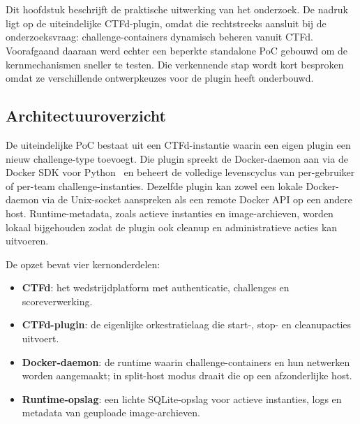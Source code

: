 
\chapter{}%
\label{ch:poc}

Dit hoofdstuk beschrijft de praktische uitwerking van het onderzoek. De nadruk ligt op de uiteindelijke CTFd-plugin, omdat die rechtstreeks aansluit bij de onderzoeksvraag: challenge-containers dynamisch beheren vanuit CTFd. Voorafgaand daaraan werd echter een beperkte standalone PoC gebouwd om de kernmechanismen sneller te testen. Die verkennende stap wordt kort besproken omdat ze verschillende ontwerpkeuzes voor de plugin heeft onderbouwd.

\section{Architectuuroverzicht}%
\label{sec:poc-architectuur}

De uiteindelijke PoC bestaat uit een CTFd-instantie waarin een eigen plugin een nieuw challenge-type toevoegt. Die plugin spreekt de Docker-daemon aan via de Docker SDK voor Python~\autocite{DockerSDKPython} en beheert de volledige levenscyclus van per-gebruiker of per-team challenge-instanties. Dezelfde plugin kan zowel een lokale Docker-daemon via de Unix-socket aanspreken als een remote Docker API op een andere host. Runtime-metadata, zoals actieve instanties en image-archieven, worden lokaal bijgehouden zodat de plugin ook cleanup en administratieve acties kan uitvoeren.

De opzet bevat vier kernonderdelen:

\begin{itemize}
  \item \textbf{CTFd}: het wedstrijdplatform met authenticatie, challenges en scoreverwerking.
  \item \textbf{CTFd-plugin}: de eigenlijke orkestratielaag die start-, stop- en cleanupacties uitvoert.
  \item \textbf{Docker-daemon}: de runtime waarin challenge-containers en hun netwerken worden aangemaakt; in split-host modus draait die op een afzonderlijke host.
  \item \textbf{Runtime-opslag}: een lichte SQLite-opslag voor actieve instanties, logs en metadata van geuploade image-archieven.
\end{itemize}

